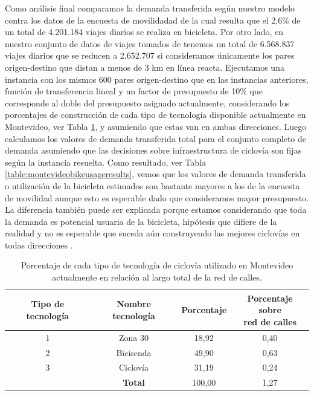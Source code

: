 Como análisis final comparamos la demanda transferida según nuestro modelo contra los datos de la encuesta de movilidadad \cite{Mauttone2017a} de la cual resulta que el 2,6\% de un total de 4.201.184 viajes diarios se realiza en bicicleta. Por otro lado, en nuestro conjunto de datos de viajes tomados de \cite{Massobrio2020} tenemos un total de 6.568.837 viajes diarios que se reducen a 2.652.707 si consideramos únicamente los pares origen-destino que distan a menos de 3 km en línea reacta. Ejecutamos una instancia con los mismos 600 pares origen-destino que en las instancias anteriores, función de transferencia lineal y un factor de presupuesto de 10\% que corresponde al doble del presupuesto asignado actualmente, considerando los porcentajes de construcción de cada tipo de tecnología disponible actualmente en Montevideo, ver Tabla \ref{table:cicloviasmontevideo}, y asumiendo que estas van en ambas direcciones. Luego calculamos los valores de demanda transferida total para el conjunto completo de demanda asumiendo que las decisiones sobre infraestructura de ciclovía son fijas según la instancia resuelta. Como resultado, ver Tabla \ref{table:montevideobikeusageresults}, vemos que los valores de demanda transferida o utilización de la bicicleta estimados son bastante mayores a los de la encuesta de movilidad aunque esto es esperable dado que consideramos mayor presupuesto. La diferencia también puede ser explicada porque estamos considerando que toda la demanda es potencial usuaria de la bicicleta, hipótesis que difiere de la realidad y no es esperable que suceda aún construyendo las mejores ciclovías en todas direcciones \cite{shwe2014}.

\begin{table}[h!]
  \centering
  \begin{tabular}{cccc}
    \toprule
      Tipo de tecnología & Nombre tecnología & Porcentaje & \shortstack{Porcentaje sobre \\ red de calles} \\
    \midrule
        1   & Zona 30    & 18,92  & 0,40   \\
        2   & Bicisenda  & 49,90  & 0,63   \\
        3   & Ciclovía   & 31,19  & 0,24   \\
    \midrule
            & \textbf{Total}  & 100,00 & 1,27   \\
    \bottomrule
  \end{tabular}
  \caption{Porcentaje de cada tipo de tecnología de ciclovía utilizado en Montevideo actualmente en relación al largo total de la red de calles.}
  \label{table:cicloviasmontevideo}
\end{table}

